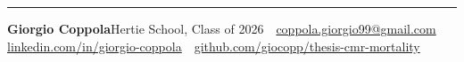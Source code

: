 \documentclass[final]{article}
\begin{document}
\vfill
{\color{rule}\rule{\textwidth}{1.2pt}}
\vspace{3mm}
\noindent\begin{minipage}{\textwidth}
  \fontsize{18.5pt}{23pt}\selectfont\color{muted}
  \centering
  {\color{ink}\textbf{Giorgio Coppola}}\quad Hertie School, Class of 2026 \qquad
  {\color{amber}\faEnvelope}\ \,\href{mailto:coppola.giorgio99@gmail.com}{coppola.giorgio99@gmail.com} \qquad
  {\color{amber}\faLinkedin}\ \,\href{http://linkedin.com/in/giorgio-coppola}{linkedin.com/in/giorgio-coppola} \qquad
  {\color{amber}\faGithub}\ \,\href{http://github.com/giocopp/thesis-cmr-mortality}{github.com/giocopp/thesis-cmr-mortality}
\end{minipage}
\end{document}
